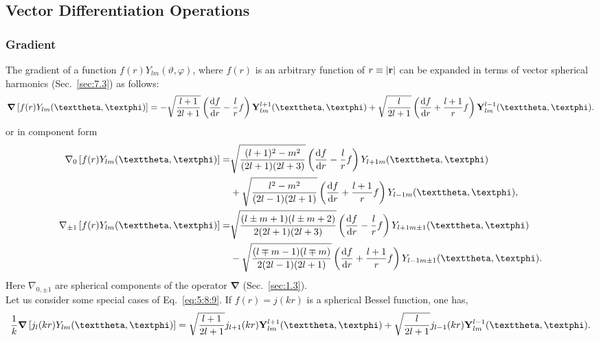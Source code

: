 \subsection{Vector Differentiation Operations}\label{sec:5.8.3}
\subsubsection{Gradient} The gradient of a function $f(r) Y_{l m}(\vartheta, \varphi)$, where $f(r)$ is an arbitrary function of $r \equiv|\mathbf{r}|$ can be expanded in terms of vector spherical harmonics (Sec.~\ref{sec:7.3}) as follows:
\begin{equation}
\boldsymbol{\nabla}\left[f(r) Y_{l m}(\vartheta, \varphi)\right]=-\sqrt{\frac{l+1}{2 l+1}}\left(\frac{\dd  f}{\dd  r}-\frac{l}{r} f\right) \vect{Y}_{l m}^{l+1}(\vartheta, \varphi)+\sqrt{\frac{l}{2 l+1}}\left(\frac{\dd  f}{\dd  r}+\frac{l+1}{r} f\right) \vect{Y}_{l m}^{l-1}(\vartheta, \varphi). \label{eq:5:8:9}
\end{equation}
or in component form
\begin{align}
\nabla_{0}\left[f(r) Y_{l m}(\vartheta, \varphi)\right]= & \sqrt{\frac{(l+1)^{2}-m^{2}}{(2 l+1)(2 l+3)}}\left(\frac{\dd  f}{\dd  r}-\frac{l}{r} f\right) Y_{l+1 m}(\vartheta, \varphi)  \notag\\
& +\sqrt{\frac{l^{2}-m^{2}}{(2 l-1)(2 l+1)}}\left(\frac{\dd  f}{\dd  r}+\frac{l+1}{r} f\right) Y_{l-1 m}(\vartheta, \varphi),  \label{eq:5:8:10}\\
\nabla_{ \pm 1}\left[f(r) Y_{l m}(\vartheta, \varphi)\right]= & \sqrt{\frac{(l \pm m+1)(l \pm m+2)}{2(2 l+1)(2 l+3)}}\left(\frac{\dd  f}{\dd  r}-\frac{l}{r} f\right) Y_{l+1 m \pm 1}(\vartheta, \varphi)  \notag\\
& -\sqrt{\frac{(l \mp m-1)(l \mp m)}{2(2 l-1)(2 l+1)}}\left(\frac{\dd  f}{\dd  r}+\frac{l+1}{r} f\right) Y_{l-1 m \pm 1}(\vartheta, \varphi). \label{eq:5:8:11}
\end{align}
Here $\nabla_{0, \pm 1}$ are spherical components of the operator $\boldsymbol{\nabla}$ (Sec.~\ref{sec:1.3}).\\
Let us consider some special cases of Eq.~\eqref{eq:5:8:9}. If $f(r)=j(k r)$ is a spherical Bessel function, one has,
\begin{equation}
\frac{1}{k} \boldsymbol{\nabla}\left[j_{l}(k r) Y_{l m}(\vartheta, \varphi)\right]=\sqrt{\frac{l+1}{2 l+1}} j_{l+1}(k r) \vect{Y}_{l m}^{l+1}(\vartheta, \varphi)+\sqrt{\frac{l}{2 l+1}} j_{l-1}(k r) \vect{Y}_{l m}^{l-1}(\vartheta, \varphi). \label{eq:5:8:12}
\end{equation}
